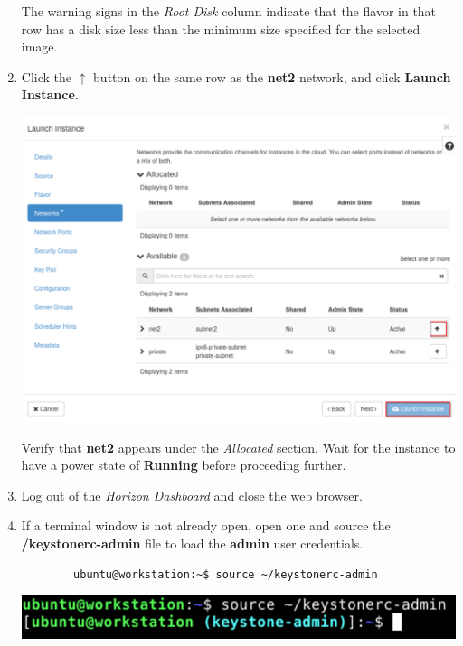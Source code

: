 \documentclass[letterpaper, 12pt]{article}
\begin{document}
\begin{enumerate}
    \begin{notebox}
        The warning signs in the \textit{Root Disk} column indicate that the flavor in that row has a disk size less
        than the minimum size specified for the selected image.
    \end{notebox}

    \item Click the $\uparrow$ button on the same row as the \textbf{net2} network, and click \textbf{Launch Instance}.

    \begin{center}
        \includegraphics[width=\linewidth]{images/part4/step6.png}
    \end{center}

    \begin{stopbox}
        Verify that \textbf{net2} appears under the \textit{Allocated} section. Wait for the instance to have a
        power state of \textbf{Running} before proceeding further.
    \end{stopbox}

    \item Log out of the \textit{Horizon Dashboard} and close the web browser.
    
    \item If a terminal window is not already open, open one and source the \textbf{\texttildemid/keystonerc-admin} file
    to load the \textbf{admin} user credentials.
    \begin{lstlisting}
        ubuntu@workstation:~$ source ~/keystonerc-admin        
    \end{lstlisting}

    \begin{center}
        \includegraphics[width=\linewidth]{images/part4/step8.png}
    \end{center}


\end{enumerate}
\end{document}
